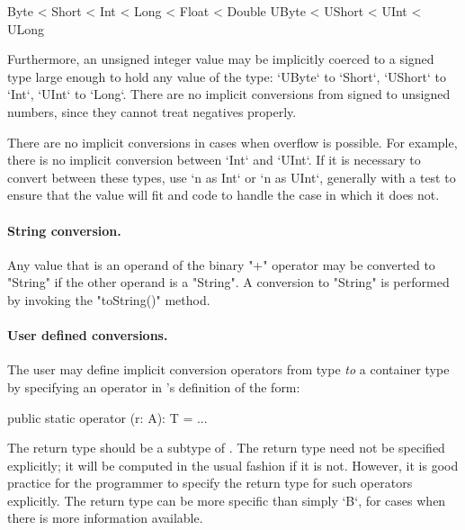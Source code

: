 \begin{xten}
Byte < Short < Int < Long < Float < Double
UByte < UShort < UInt < ULong
\end{xten}

Furthermore, an unsigned integer value may be implicitly coerced to a signed type
large 
enough to hold any value of the type: \xcd`UByte` to \xcd`Short`, \xcd`UShort`
to \xcd`Int`, \xcd`UInt` to \xcd`Long`.  There are no implicit conversions
from signed to unsigned numbers, since they cannot treat negatives properly.

There are no implicit conversions in cases when overflow is possible.  For
example, there is no implicit conversion between \xcd`Int` and \xcd`UInt`.  If
it is necessary to convert between these types, use \xcd`n as Int` or 
\xcd`n as UInt`, generally with a test to ensure that the value will fit and
code to handle the case in which it does not.  



\paragraph{String conversion.}
Any value that is an operand of the binary
\xcd"+" operator may
be converted to \xcd"String" if the other operand is a \xcd"String".
A conversion to \xcd"String" is performed by invoking the \xcd"toString()"
method.


\paragraph{User defined conversions.}\label{sec:user-defined-conversions}

The user may define implicit conversion operators from type  {\em to} a
container type  by specifying an operator in 's definition of the form:

\begin{xten}
  public static operator (r: A): T = ... 
\end{xten}

The return type  should be a subtype of . The return
type need not be specified explicitly; it will be computed in the
usual fashion if it is not. However, it is good practice for the
programmer to specify the return type for such operators explicitly.
The return type can be more specific than simply \xcd`B`, for cases when there
is more information available.



